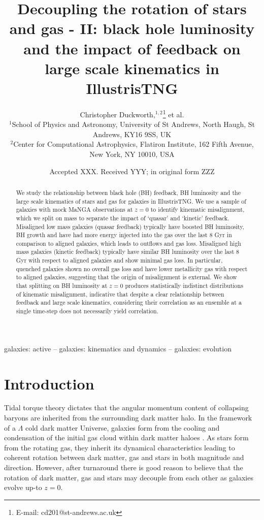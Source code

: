 \documentclass[fleqn,usenatbib]{mnras}
\title[Decoupling the rotation of stars and gas - II]{Decoupling the rotation of stars and gas - II: black hole luminosity and the impact of feedback on large scale kinematics in IllustrisTNG}
\author[C. Duckworth et al.]{Christopher Duckworth,$^{1,2}$\thanks{E-mail: cd201@st-andrews.ac.uk}
et al.
\\
$^{1}$School of Physics and Astronomy, University of St Andrews, North Haugh, St Andrews, KY16 9SS, UK\\
$^{2}$Center for Computational Astrophysics, Flatiron Institute, 162 Fifth Avenue, New York, NY 10010, USA\\
}
\date{Accepted XXX. Received YYY; in original form ZZZ}
\begin{document}
\label{firstpage}
\pagerange{\pageref{firstpage}--\pageref{lastpage}}
\maketitle

\begin{abstract}
We study the relationship between black hole (BH) feedback, BH luminosity and the large scale kinematics of stars and gas for galaxies in IllustrisTNG. We use a sample of galaxies with mock MaNGA observations at $z=0$ to identify kinematic misalignment, which we split on mass to separate the impact of `quasar' and `kinetic' feedback. 
Misaligned low mass galaxies (quasar feedback) typically have boosted BH luminosity, BH growth and have had more energy injected into the gas over the last 8 Gyr in comparison to aligned galaxies, which leads to outflows and gas loss.
Misaligned high mass galaxies (kinetic feedback) typically have similar BH luminosity over the last 8 Gyr with respect to aligned galaxies and show minimal gas loss. In particular, quenched galaxies shown no overall gas loss and have lower metallicity gas with respect to aligned galaxies, suggesting that the origin of misalignment is external.
We show that splitting on BH luminosity at $z=0$ produces statistically indistinct distributions of kinematic misalignment, indicative that despite a clear relationship between feedback and large scale kinematics, considering their correlation as an ensemble at a single time-step does not necessarily yield correlation.
\end{abstract}

\begin{keywords}
galaxies: active -- galaxies: kinematics and dynamics -- galaxies: evolution
\end{keywords}



\section{Introduction}
Tidal torque theory \citep[][]{hoyle1951, peebles1969, Doroshkevich1970} dictates that the angular momentum content of collapsing baryons are inherited from the surrounding dark matter halo. In the framework of a $\Lambda$ cold dark matter Universe, galaxies form from the cooling and condensation of the initial gas cloud within dark matter haloes \citep{fall1980, mo1998}. As stars form from the rotating gas, 
they inherit its dynamical characteristics leading to coherent rotation between dark matter, gas and stars in both magnitude and direction. However, after turnaround there is good reason to believe that the rotation of dark matter, gas and stars may decouple from each other as galaxies evolve up-to $z=0$. 
\end{document}
